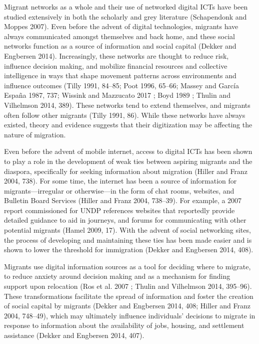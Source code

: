 Migrant networks as a whole and their use of networked digital ICTs have
been studied extensively in both the scholarly and grey literature
(Schapendonk and Moppes 2007). Even before the advent of digital
technologies, migrants have always communicated amongst themselves and
back home, and these social networks function as a source of information
and social capital (Dekker and Engbersen 2014). Increasingly, these
networks are thought to reduce risk, influence decision making, and
mobilize financial resources and collective intelligence in ways that
shape movement patterns across environments and influence outcomes
(Tilly 1991, 84--85; Poot 1996, 65--66; Massey and García España 1987,
737; Wissink and Mazzucato 2017 ; Boyd 1989 ; Thulin and Vilhelmson
2014, 389). These networks tend to extend themselves, and migrants often
follow other migrants (Tilly 1991, 86). While these networks have always
existed, theory and evidence suggests that their digitization may be
affecting the nature of migration.

Even before the advent of mobile internet, access to digital ICTs has
been shown to play a role in the development of weak ties between
aspiring migrants and the diaspora, specifically for seeking information
about migration (Hiller and Franz 2004, 738). For some time, the
internet has been a source of information for migrants---irregular or
otherwise---in the form of chat rooms, websites, and Bulletin Board
Services (Hiller and Franz 2004, 738--39). For example, a 2007 report
commissioned for UNDP references websites that reportedly provide
detailed guidance to aid in journeys, and forums for communicating with
other potential migrants (Hamel 2009, 17). With the advent of social
networking sites, the process of developing and maintaining these ties
has been made easier and is shown to lower the threshold for immigration
(Dekker and Engbersen 2014, 408).

Migrants use digital information sources as a tool for deciding where to
migrate, to reduce anxiety around decision making and as a mechanism for
finding support upon relocation (Ros et al. 2007 ; Thulin and Vilhelmson
2014, 395--96). These transformations facilitate the spread of
information and foster the creation of social capital by migrants
(Dekker and Engbersen 2014, 408; Hiller and Franz 2004, 748--49), which
may ultimately influence individuals' decisions to migrate in response
to information about the availability of jobs, housing, and settlement
assistance (Dekker and Engbersen 2014, 407).

